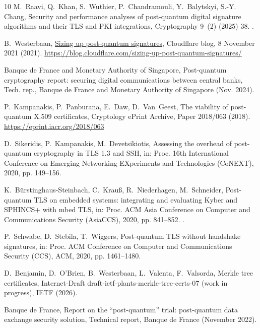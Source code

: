 \documentclass[preprint,12pt]{elsarticle}
\begin{document}
\begin{thebibliography}{10}
M.~Raavi, Q.~Khan, S.~Wuthier, P.~Chandramouli, Y.~Balytskyi, S.-Y. Chang,
  Security and performance analyses of post-quantum digital signature
  algorithms and their {TLS} and {PKI} integrations, Cryptography 9~(2) (2025)
  38.
\newblock \href {https://doi.org/10.3390/cryptography9020038}
  {}.

B.~Westerbaan,
  \href{https://blog.cloudflare.com/sizing-up-post-quantum-signatures/}{Sizing
  up post-quantum signatures}, Cloudflare blog, 8 November 2021 (2021).
\newline\urlprefix\url{https://blog.cloudflare.com/sizing-up-post-quantum-signatures/}

{Banque de France and Monetary Authority of Singapore}, Post-quantum
  cryptography report: securing digital communications between central banks,
  Tech. rep., Banque de France and Monetary Authority of Singapore (Nov. 2024).

P.~Kampanakis, P.~Panburana, E.~Daw, D.~Van~Geest, The viability of
  post-quantum {X.509} certificates, Cryptology ePrint Archive, Paper 2018/063
  (2018).
\newblock \url{https://eprint.iacr.org/2018/063}

D.~Sikeridis, P.~Kampanakis, M.~Devetsikiotis, Assessing the overhead of
  post-quantum cryptography in {TLS} 1.3 and {SSH}, in: Proc. 16th
  International Conference on Emerging Networking EXperiments and Technologies
  (CoNEXT), 2020, pp. 149--156.

K.~B{\"u}rstinghaus-Steinbach, C.~Krau{\ss}, R.~Niederhagen, M.~Schneider,
  Post-quantum {TLS} on embedded systems: integrating and evaluating {Kyber}
  and {SPHINCS+} with {mbed TLS}, in: Proc. ACM Asia Conference on Computer and
  Communications Security (AsiaCCS), 2020, pp. 841--852.
\newblock \href {https://doi.org/10.1145/3320269.3384725}
  {}.

P.~Schwabe, D.~Stebila, T.~Wiggers, Post-quantum {TLS} without handshake
  signatures, in: Proc. ACM Conference on Computer and Communications Security
  (CCS), ACM, 2020, pp. 1461--1480.

D.~Benjamin, D.~O'Brien, B.~Westerbaan, L.~Valenta, F.~Valsorda, Merkle tree
  certificates, Internet-Draft draft-ietf-plants-merkle-tree-certs-07 (work in
  progress), IETF (2026).

{Banque de France}, Report on the ``post-quantum'' trial: post-quantum data
  exchange security solution, Technical report, Banque de France (November
  2022).


\end{thebibliography}
\end{document}

